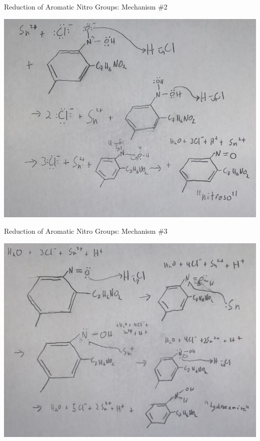 \documentclass[notes]{beamer}
\begin{document}
\begin{frame}{Reduction of Aromatic Nitro Groups: Mechanism \#2}
    \begin{center}
        \includegraphics[scale=.35]{aromatic_nitro_reduction_two.JPG}
    \end{center}
    
\end{frame}

\begin{frame}{Reduction of Aromatic Nitro Groups: Mechanism \#3}
    \begin{center}
        \includegraphics[scale=.35]{aromatic_nitro_reduction_three.JPG}
    \end{center}
    
\end{frame}
\end{document}
